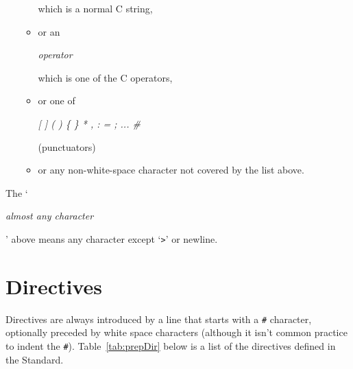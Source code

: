 \begin{enumerate}
\begin{itemize}
 which is a normal C string,
     \item or an \begin{center}\textit{operator}\end{center}

 which is one of the C operators,
     \item or one of \begin{center}\textit{[ ] ( ) \{ \} * , : = ; ... \#}\end{center}

 (punctuators)
     \item or any non-white-space character not covered by the list above.
    \end{itemize}
   
  \end{enumerate}

  The `\begin{center}\textit{almost any character}\end{center}

' above means any character
   except `\texttt{>}' or newline.


 
   \section{Directives}
        

  

  Directives are always introduced by a line that starts with
   a \texttt{\#} character, optionally preceded by white space characters
   (although it isn't common practice to indent the \texttt{\#}).
   Table~\ref{tab:prepDir} below is a list of the directives defined in the
   Standard.


